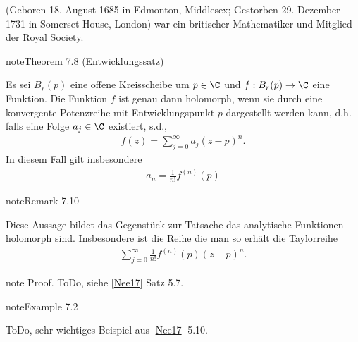 \documentclass[letterpaper,10pt,german]{jupyterBook}
\begin{document}
\begin{sphinxShadowBox}

\sphinxAtStartPar
{} (Geboren 18. August 1685 in Edmonton, Middlesex; Gestorben 29. Dezember 1731 in Somerset House, London) war ein britischer Mathematiker und Mitglied der Royal Society.
\end{sphinxShadowBox}
\label{complexanalysis/powerseries:theorem-5}
\begin{sphinxadmonition}{note}{Theorem 7.8 (Entwicklungssatz)}



\sphinxAtStartPar
Es sei \(B_r(p)\) eine offene Kreisscheibe um \(p\in\C\) und \(f:B_r(p)\to\C\) eine Funktion. Die Funktion \(f\) ist genau dann holomorph, wenn sie durch eine konvergente Potenzreihe mit Entwicklungspunkt \(p\) dargestellt werden kann, d.h. falls eine Folge \(a_j\in\C\) existiert, s.d.,
\begin{equation*}
\begin{split}f(z) = \sum_{j=0}^\infty a_j (z-p)^n.\end{split}
\end{equation*}
\sphinxAtStartPar
In diesem Fall gilt insbesondere
\begin{equation*}
\begin{split}a_n = \frac{1}{n!} f^{(n)}(p)\end{split}
\end{equation*}\end{sphinxadmonition}
\label{complexanalysis/powerseries:remark-6}
\begin{sphinxadmonition}{note}{Remark 7.10}



\sphinxAtStartPar
Diese Aussage bildet das Gegenstück zur Tatsache das analytische Funktionen holomorph sind. Insbesondere ist die Reihe die man so erhält die Taylorreihe
\begin{equation*}
\begin{split}\sum_{j=0}^\infty \frac{1}{n!} f^{(n)}(p) (z-p)^n.\end{split}
\end{equation*}\end{sphinxadmonition}

\begin{sphinxadmonition}{note}
\sphinxAtStartPar
Proof. ToDo, siehe {[}\hyperlink{cite.references:id13}{Nee17}{]} Satz 5.7.
\end{sphinxadmonition}
\label{complexanalysis/powerseries:example-7}
\begin{sphinxadmonition}{note}{Example 7.2}



\sphinxAtStartPar
ToDo, sehr wichtiges Beispiel aus {[}\hyperlink{cite.references:id13}{Nee17}{]} 5.10.
\end{sphinxadmonition}
\end{document}
